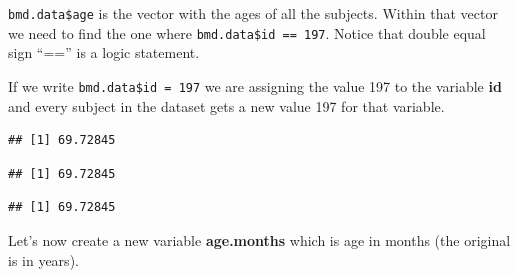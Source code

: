 \documentclass[
]{book}
\newenvironment{Shaded}{\begin{snugshade}}{\end{snugshade}}
\newcommand{\CommentTok}[1]{\textcolor[rgb]{0.56,0.35,0.01}{\textit{#1}}}
\newcommand{\DecValTok}[1]{\textcolor[rgb]{0.00,0.00,0.81}{#1}}
\newcommand{\NormalTok}[1]{#1}
\newcommand{\OtherTok}[1]{\textcolor[rgb]{0.56,0.35,0.01}{#1}}
\newcommand{\SpecialCharTok}[1]{\textcolor[rgb]{0.00,0.00,0.00}{#1}}
\newcommand{\StringTok}[1]{\textcolor[rgb]{0.31,0.60,0.02}{#1}}
\begin{document}
\texttt{bmd.data\$age} is the vector with the ages of all the subjects. Within that
vector we need to find the one where \texttt{bmd.data\$id\ ==\ 197}. Notice that double
equal sign ``=='' is a logic statement.

If we write \texttt{bmd.data\$id\ =\ 197} we are
assigning the value 197 to the variable \textbf{id} and every subject in the dataset
gets a new value 197 for that variable.

\begin{Shaded}
\end{Shaded}

\begin{verbatim}
## [1] 69.72845
\end{verbatim}

\begin{Shaded}
\end{Shaded}

\begin{verbatim}
## [1] 69.72845
\end{verbatim}

\begin{Shaded}
\end{Shaded}

\begin{verbatim}
## [1] 69.72845
\end{verbatim}

Let's now create a new variable \textbf{age.months} which is age in months (the
original is in years).

\begin{Shaded}
\end{Shaded}
\end{document}
